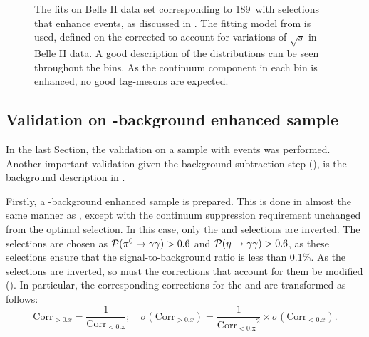 \begin{figure}[htbp!]
{    }
    \caption{\label{fig:mbc_qqbar_ehnhanced_fits}The fits on Belle II data set corresponding to 189~\invfb with selections that enhance \epem\ra\qqbar events, as discussed in .
    The fitting model from  is used, defined on the corrected \Mbc to account for variations of $\sqrt{s}$ in Belle II data.
    A good description of the \Mbc distributions can be seen throughout the \EB bins.
    As the continuum component in each \EB bin is enhanced, no good tag-\B mesons are expected.
    }
\end{figure}

\subsection{Validation on \texorpdfstring{\BB}{BB}-background enhanced sample}\label{sec:bb_background_validation}

In the last Section, the validation on a sample with \epem\ra\qqbar events was performed.
Another important validation given the background subtraction step (),
is the \BB background description in \MC.

Firstly, a \BB-background enhanced sample is prepared.
This is done in almost the same manner as , except with the continuum suppression requirement unchanged from the optimal selection.
In this case, only the \piVeto and \etaVeto selections are inverted.
The selections are chosen as ${\mathcal{P}(\pi^0\rightarrow\gamma\gamma)}>0.6$ and ${\mathcal{P}(\eta\rightarrow\gamma\gamma)}>0.6$, as these selections ensure that the signal-to-background ratio is less than 0.1\%.
As the selections are inverted, so must the corrections that account for them be modified ().
In particular, the corresponding corrections for the \piVeto and \etaVeto are transformed as follows:
\begin{equation}\label{eq:correction_transform}
    \mathrm{Corr}_{>0.x} = \frac{1}{\mathrm{Corr_{<0.x}}}; \quad \sigma(\mathrm{Corr}_{>0.x}) =  \frac{1}{\mathrm{Corr_{<0.x}}^2} \times \sigma(\mathrm{Corr}_{<0.x}).
\end{equation}

